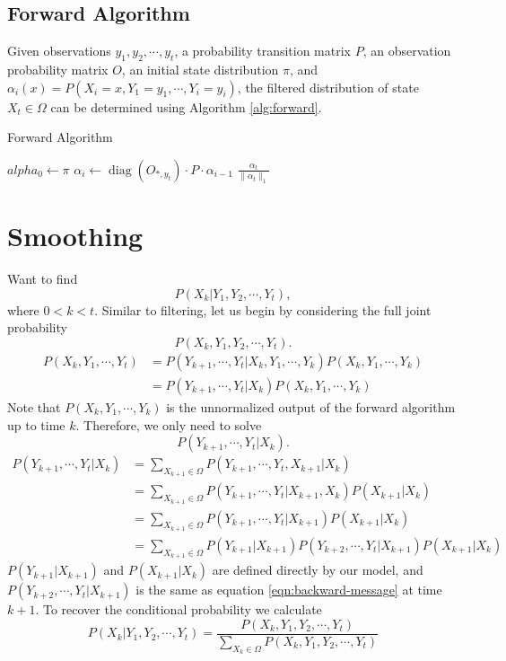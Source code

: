 \documentclass{article}
\DeclareMathOperator{\diag}{diag}
\begin{document}
\subsection{Forward Algorithm}
Given observations $y_1, y_2, \cdots, y_t$, a probability transition matrix $P$, an observation probability matrix $O$, an initial state distribution $\pi$, and $\alpha_i(x) = P(X_i = x, Y_1 = y_1, \cdots, Y_i = y_i)$, the filtered distribution of state $X_t \in \Omega$ can be determined using Algorithm \ref{alg:forward}.
\begin{algorithm}
\caption{Forward Algorithm}
\label{alg:forward}
\begin{algorithmic}
\STATE $alpha_0 \leftarrow \pi$
\STATE $\alpha_i \leftarrow \diag(O_{*,y_t}) \cdot P \cdot \alpha_{i-1}$
\ENDFOR
\RETURN $\frac{\alpha_t}{\|\alpha_t\|_1}$
\end{algorithmic}
\end{algorithm}

\section{Smoothing}
Want to find
\begin{equation}
\label{eqn:smoothing}
P(X_k | Y_1, Y_2, \cdots, Y_t), 
\end{equation}
where $0<k<t$.
Similar to filtering, let us begin by considering the full joint probability 
\begin{equation}
P(X_{k}, Y_{1}, Y_{2}, \cdots, Y_t).
\end{equation}
\begin{align}
P(X_k, Y_1, \cdots, Y_t) &= P(Y_{k+1}, \cdots, Y_t | X_k, Y_1, \cdots, Y_k) P(X_k,  Y_1, \cdots, Y_k) \\
&= P(Y_{k+1}, \cdots, Y_t | X_k) P(X_k,  Y_1, \cdots, Y_k)
\end{align}
Note that $P(X_k, Y_1, \cdots, Y_k)$ is the unnormalized output of the forward algorithm up to time $k$. Therefore, we only need to solve 
\begin{equation}
\label{eqn:backward-message}
P(Y_{k+1}, \cdots, Y_t | X_k).
\end{equation}
\begin{align}
P(Y_{k+1}, \cdots, Y_t | X_k) &= \sum_{X_{k+1} \in \Omega}{P(Y_{k+1}, \cdots, Y_t, X_{k+1} | X_k)} \\
&= \sum_{X_{k+1} \in \Omega}{P(Y_{k+1}, \cdots, Y_t | X_{k+1} , X_k) P(X_{k+1} | X_k)} \\
&= \sum_{X_{k+1} \in \Omega}{P(Y_{k+1}, \cdots, Y_t | X_{k+1}) P(X_{k+1} | X_k)} \\
&= \sum_{X_{k+1} \in \Omega}{P(Y_{k+1} | X_{k+1}) P(Y_{k+2}, \cdots, Y_t | X_{k+1}) P(X_{k+1} | X_k)} 
\end{align}
$P(Y_{k+1} | X_{k+1})$ and $P(X_{k+1} | X_k)$ are defined directly by our model, and $P(Y_{k+2}, \cdots, Y_t | X_{k+1})$ is the same as equation \ref{eqn:backward-message} at time $k+1$.
To recover the conditional probability we calculate
\begin{equation}
P(X_k | Y_1, Y_{2}, \cdots, Y_t) = \frac{P(X_k, Y_1, Y_{2}, \cdots, Y_t)}{\sum_{X_k \in \Omega}{P(X_k, Y_1, Y_{2}, \cdots, Y_t)}}
\end{equation}
\end{document}
